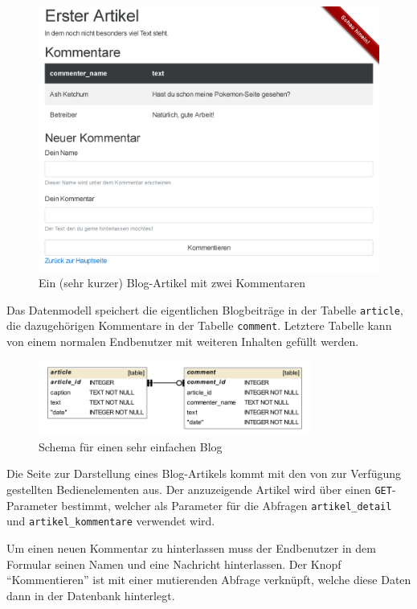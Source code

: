 \begin{figure}[h]
  \centering \includegraphics[width=\textwidth-2pt,frame]{images/screenshots/20161019/enduser-blog-article.png}
  \caption{Ein (sehr kurzer) Blog-Artikel mit zwei Kommentaren}
  \label{fig:enduser-blog-article}
\end{figure}

Das Datenmodell speichert die eigentlichen Blogbeiträge in der Tabelle \texttt{article}, die dazugehörigen Kommentare in der Tabelle \texttt{comment}. Letztere Tabelle kann von einem normalen Endbenutzer mit weiteren Inhalten gefüllt werden.

\begin{figure}[h]
  \centering \includegraphics[width=0.8\textwidth]{images/db-schema/blog}
  \caption{Schema für einen sehr einfachen Blog}
  \label{fig:project-blog-schema}
\end{figure}

Die Seite zur Darstellung eines Blog-Artikels kommt mit den von \idename{} zur Verfügung gestellten Bedienelementen aus. Der anzuzeigende Artikel wird über einen \texttt{GET}-Parameter bestimmt, welcher als Parameter für die Abfragen \texttt{artikel\_detail} und \texttt{artikel\_kommentare} verwendet wird.

Um einen neuen Kommentar zu hinterlassen muss der Endbenutzer in dem Formular seinen Namen und eine Nachricht hinterlassen. Der Knopf "`Kommentieren"' ist mit einer mutierenden Abfrage verknüpft, welche diese Daten dann in der Datenbank hinterlegt.

